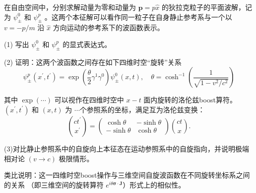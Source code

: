 \begin{5}
    在自由空间中，分别求解动量为零和动量为 $\mathbf{p}=p \hat{x}$ 的狄拉克粒子的平面波解，记为 $\psi_{ \pm}^{0}$ 和 $\psi_{ \pm}^{p}$ 。这两个本征解可以看作同一粒子在自身静止参考系与一个以 $v=-p / m$ 沿 $\hat{x}$ 方向运动的参考系下的波函数表示。

(1) 写出 $\psi_{ \pm}^{0}$ 和 $\psi_{ \pm}^{p}$ 的显式表达式。

(2) 证明：这两个波函数之间存在如下四维时空``旋转''关系
$$\psi_{\pm}^{p}\left(x^{\prime}, t^{\prime}\right)
=\exp \left(\frac{\theta}{2} \gamma^{1} \gamma^{0}\right) \psi_{\pm}^{0}(x, t), 
\quad \theta=\cosh ^{-1}\left(\frac{1}{\sqrt{1-v^{2} / c^{2}}}\right)$$

其中 $\exp (\cdots)$ 可以视作在四维时空中 $x-t$ 面内旋转的洛伦兹boost算符。
$\left(x^{\prime}, t^{\prime}\right)$ 和 $(x, t)$ 为 $\cdots$个参照系的坐标，满足互为洛伦兹变换：
$$\binom{ct^{\prime}}{x^{\prime}}=\begin{pmatrix}
\cosh \theta & -\sinh \theta \\
-\sinh \theta & \cosh \theta
\end{pmatrix}\binom{ct}{x}.$$

(3)对比静止参照系中的自旋向上本征态在运动参照系中的自旋指向，并说明极端相对论 $(v \rightarrow c)$ 极限情形。

类比说明：这一四维时空boost操作与三维空间自旋波函数在不同旋转坐标系之间的关系
（即三维空间的旋转算符 $e^{i \theta \boldsymbol{\sigma} \cdot \mathbf{J}}$）形式上的相似性。
\end{5}
